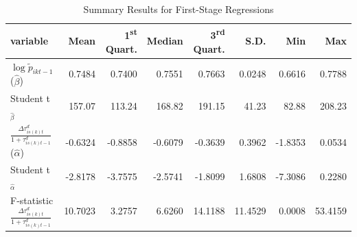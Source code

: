 \documentclass[a4paper,11pt]{article}
\begin{document}
\begin{table}[htbp]\centering
\caption{Summary Results for First-Stage Regressions\label{tab: FS_sitc5}}
\begin{tabular} {@{} l r r r r r r r @{}} \\ \hline
\textbf{variable } & \textbf{Mean} & \textbf{1\textsuperscript{st} Quart.} & \textbf{Median} & \textbf{3\textsuperscript{rd} Quart.} & \textbf{ S.D.} & \textbf{Min} & \textbf{Max} \\
\hline
 $\log \widetilde{p}_{ikt-1}$ ($\widehat{\beta}$)&     0.7484 &     0.7400 &     0.7551 &     0.7663 &     0.0248 &     0.6616 &     0.7788 \\
Student t$_{\widehat{\beta}}$  &   157.07 &   113.24 &   168.82 &   191.15 &    41.23 &    82.88 &   208.23 \\
$\frac{\Delta \tau^d_{is(k)t}}{1+\tau_{is(k)t-1}^d}$ ($\widehat{\alpha}$)  &    -0.6324 &    -0.8858 &    -0.6079 &    -0.3639 &     0.3962 &    -1.8353 &     0.0534 \\
 Student t$_{\widehat{\alpha}}$  &    -2.8178 &    -3.7575 &    -2.5741 &    -1.8099 &     1.6808 &    -7.3086 &     0.2280 \\
  F-statistic $\frac{\Delta \tau^d_{is(k)t}}{1+\tau_{is(k)t-1}^d}$  &    10.7023 &     3.2757 &     6.6260 &    14.1188 &    11.4529 &     0.0008 &    53.4159 \\
\hline
\end{tabular}
\end{table}
\end{document}
